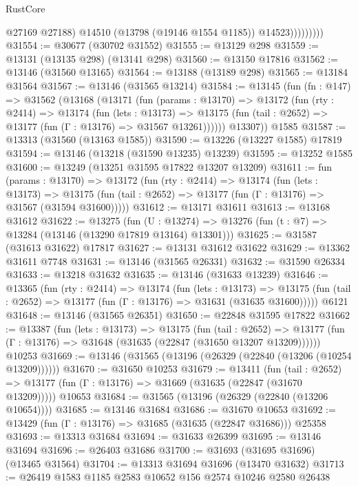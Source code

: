 \begin{lexlean}{RustCore}
\begin{coremodule}
                        @27169
                        @27188)
                      @14510
                      (@13798 (@19146 @1554 @1185))
                      @14523)))))))))
@31554 := @30677 (@30702 @31552)
@31555 := @13129 @298
@31559 := @13131 (@13135 @298) (@13141 @298)
@31560 := @13150 @17816
@31562 := @13146 (@31560 @13165)
@31564 := @13188 (@13189 @298)
@31565 := @13184 @31564
@31567 := @13146 (@31565 @13214)
@31584 := @13145
    (fun (fn : @147) =>
    @31562
      (@13168
        (@13171
          (fun (params : @13170) =>
          @13172
            (fun (rty : @2414) =>
            @13174
              (fun (lets : @13173) =>
              @13175 (fun (tail : @2652) => @13177 (fun (Γ : @13176) => @31567 @13261))))))
        @13307))
    @1585
@31587 := @13313 (@31560 (@13163 @1585))
@31590 := @13226 (@13227 @1585) @17819
@31594 := @13146 (@13218 (@31590 @13235) @13239)
@31595 := @13252 @1585
@31600 := @13249 (@13251 @31595 @17822 @13207 @13209)
@31611 := fun (params : @13170) =>
  @13172
    (fun (rty : @2414) =>
    @13174
      (fun (lets : @13173) =>
      @13175 (fun (tail : @2652) => @13177 (fun (Γ : @13176) => @31567 (@31594 @31600)))))
@31612 := @13171 @31611
@31613 := @13168 @31612
@31622 := @13275
    (fun (U : @13274) => @13276 (fun (t : @7) => @13284 (@13146 (@13290 @17819 @13164) @13301)))
@31625 := @31587 (@31613 @31622) @17817
@31627 := @13131 @31612 @31622
@31629 := @13362 @31611 @7748
@31631 := @13146 (@31565 @26331)
@31632 := @31590 @26334
@31633 := @13218 @31632
@31635 := @13146 (@31633 @13239)
@31646 := @13365
    (fun (rty : @2414) =>
    @13174
      (fun (lets : @13173) =>
      @13175 (fun (tail : @2652) => @13177 (fun (Γ : @13176) => @31631 (@31635 @31600)))))
    @6121
@31648 := @13146 (@31565 @26351)
@31650 := @22848 @31595 @17822
@31662 := @13387
    (fun (lets : @13173) =>
    @13175
      (fun (tail : @2652) =>
      @13177 (fun (Γ : @13176) => @31648 (@31635 (@22847 (@31650 @13207 @13209))))))
    @10253
@31669 := @13146 (@31565 (@13196 (@26329 (@22840 (@13206 (@10254 @13209))))))
@31670 := @31650 @10253
@31679 := @13411
    (fun (tail : @2652) => @13177 (fun (Γ : @13176) => @31669 (@31635 (@22847 (@31670 @13209)))))
    @10653
@31684 := @31565 (@13196 (@26329 (@22840 (@13206 @10654))))
@31685 := @13146 @31684
@31686 := @31670 @10653
@31692 := @13429 (fun (Γ : @13176) => @31685 (@31635 (@22847 @31686))) @25358
@31693 := @13313 @31684
@31694 := @31633 @26399
@31695 := @13146 @31694
@31696 := @26403 @31686
@31700 := @31693 (@31695 @31696) (@13465 @31564)
@31704 := @13313 @31694 @31696 (@13470 @31632)
@31713 := @26419 @1583 @1185 @2583 @10652 @156 @2574 @10246 @2580 @26438

\end{coremodule}
\end{lexlean}
